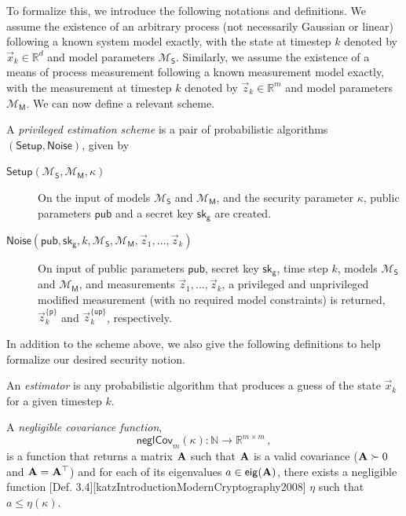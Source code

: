 To formalize this, we introduce the following notations and definitions. We assume the existence of an arbitrary process (not necessarily Gaussian or linear) following a known system model exactly, with the state at timestep $k$ denoted by $\vec{x}_k\in\mathbb{R}^d$ and model parameters $\mathcal{M}_{\mathsf{S}}$. Similarly, we assume the existence of a means of process measurement following a known measurement model exactly, with the measurement at timestep $k$ denoted by $\vec{z}_k\in\mathbb{R}^m$ and model parameters $\mathcal{M}_{\mathsf{M}}$. We can now define a relevant scheme.
\begin{definition}
    A \textit{privileged estimation scheme} is a pair of probabilistic algorithms $(\mathsf{Setup},\mathsf{Noise})$, given by
    \begin{description}
        \item[$\mathsf{Setup}(\mathcal{M}_{\mathsf{S}}, \mathcal{M}_{\mathsf{M}}, \kappa)$] On the input of models $\mathcal{M}_{\mathsf{S}}$ and $\mathcal{M}_{\mathsf{M}}$, and the security parameter $\kappa$, public parameters $\mathsf{pub}$ and a secret key $\mathsf{sk}_{\mathsf{g}}$ are created.
        \item[$\mathsf{Noise}(\mathsf{pub}, \mathsf{sk}_{\mathsf{g}}, k, \mathcal{M}_{\mathsf{S}}, \mathcal{M}_{\mathsf{M}}, \vec{z}_1, \dots, \vec{z}_k)$] On input of public parameters $\mathsf{pub}$, secret key $\mathsf{sk}_{\mathsf{g}}$, time step $k$, models $\mathcal{M}_{\mathsf{S}}$ and $\mathcal{M}_{\mathsf{M}}$, and measurements $\vec{z}_1,\dots,\vec{z}_k$, a privileged and unprivileged modified measurement (with no required model constraints) is returned, $\vec{z}_k^{\{\mathsf{p}\}}$ and $\vec{z}_k^{\{\mathsf{up}\}}$, respectively.
    \end{description}
\end{definition}
In addition to the scheme above, we also give the following definitions to help formalize our desired security notion.
\begin{definition}\label{def:priv_estimation:crypto_estimator}
    An \textit{estimator} is any probabilistic algorithm that produces a guess of the state $\vec{x}_k$ for a given timestep $k$.
\end{definition}
\begin{definition}\label{def:priv_estimation:negligible_covariance}
    A \textit{negligible covariance function},
    \begin{equation}
        \mathsf{neglCov}_m(\kappa):\mathbb{N}\rightarrow \mathbb{R}^{m\times m}\,,
    \end{equation}
    is a function that returns a matrix ${{\mathbf{A}}}$ such that ${{\mathbf{A}}}$ is a valid covariance (${{\mathbf{A}}}\succ 0$ and ${{\mathbf{A}}}={{\mathbf{A}}}^\top$) and for each of its eigenvalues $a\in\mathsf{eig}({{\mathbf{A}}})$, there exists a negligible function [Def. 3.4][katzIntroductionModernCryptography2008] $\eta$ such that $a\leq\eta(\kappa)$.
\end{definition}

